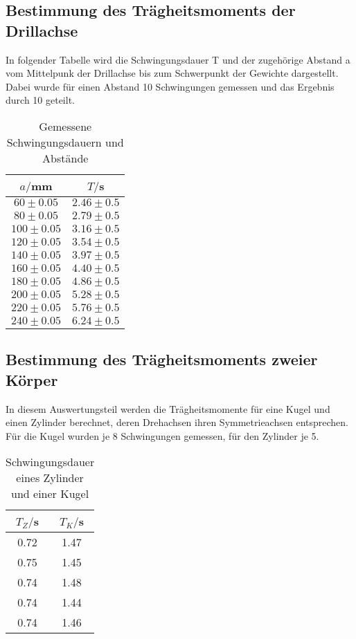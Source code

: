 \subsection{Bestimmung des Trägheitsmoments der Drillachse}
In folgender Tabelle wird die Schwingungsdauer T und der zugehörige Abstand a vom Mittelpunk der Drillachse bis 
zum Schwerpunkt der Gewichte dargestellt. Dabei wurde für einen Abstand 10 Schwingungen gemessen und das Ergebnis
durch 10 geteilt.


\begin{table}[H]
  \centering
  \caption{Gemessene Schwingungsdauern und Abstände}
  \label{tab:Gemessene Schwingungsdauern und Abstände}
  \begin{tabular}{c c}
    \toprule
    $a/$mm & $T/$s \\
    \midrule
     $60 \pm 0.05$ & $2.46 \pm 0.5$ \\ 
     $80 \pm 0.05$ & $2.79 \pm 0.5$ \\
    $100 \pm 0.05$ & $3.16 \pm 0.5$ \\
    $120 \pm 0.05$ & $3.54 \pm 0.5$ \\
    $140 \pm 0.05$ & $3.97 \pm 0.5$ \\
    $160 \pm 0.05$ & $4.40 \pm 0.5$ \\
    $180 \pm 0.05$ & $4.86 \pm 0.5$ \\
    $200 \pm 0.05$ & $5.28 \pm 0.5$ \\
    $220 \pm 0.05$ & $5.76 \pm 0.5$ \\
    $240 \pm 0.05$ & $6.24 \pm 0.5$ \\
    \bottomrule
  \end{tabular}
\end{table} 







\subsection{Bestimmung des Trägheitsmoments zweier Körper}
In diesem Auswertungsteil werden die Trägheitsmomente für eine Kugel und einen 
Zylinder berechnet, deren Drehachsen ihren Symmetrieachsen entsprechen.
Für die Kugel wurden je 8 Schwingungen gemessen, für den Zylinder je 5.
\begin{table}[H]
  \centering
  \caption{Schwingungsdauer eines Zylinder und einer Kugel}
  \label{tab:Schwingungsdauer von Zylinder und Kugel}
  \begin{tabular}{c c}
    \toprule
    $T_Z/$s & $T_K/$s \\
    \midrule
    0.72 & 1.47 \\
    0.75 & 1.45 \\
    0.74 & 1.48 \\
    0.74 & 1.44 \\
    0.74 & 1.46 \\
    \bottomrule
  \end{tabular}
\end{table}




